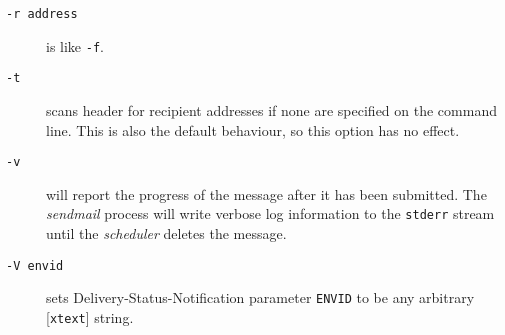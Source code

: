\begin{description}
\item[ {\tt -r address}] \mbox{}

is like {\tt -f}.



\item[ {\tt -t}] \mbox{}

scans header for recipient addresses if none are specified 
on the command line. This is also the default behaviour, so this option has no effect.



\item[ {\tt -v}] \mbox{}

will report the progress of the message after it has been 
submitted. The {\em sendmail\/} process will write verbose log information 
to the {\tt stderr} stream until the {\em scheduler\/} deletes the message.



\item[ {\tt -V envid}] \mbox{}

sets Delivery-Status-Notification parameter {\tt ENVID} 
to be any arbitrary [{\tt xtext}] string.

\end{description}
